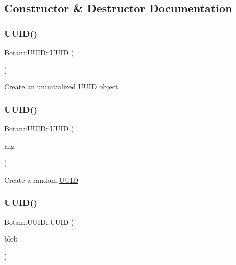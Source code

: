 \subsection{Constructor \& Destructor Documentation}
\mbox{\label{class_botan_1_1_u_u_i_d_a1e8e37568ead09e587ca96cebcbab9d2}} 
\subsubsection{\texorpdfstring{U\+U\+I\+D()}{UUID()}\hspace{0.1cm}{\footnotesize\ttfamily [1/4]}}
{\footnotesize\ttfamily Botan\+::\+U\+U\+I\+D\+::\+U\+U\+ID (\begin{DoxyParamCaption}{ }\end{DoxyParamCaption})\hspace{0.3cm}{\ttfamily [inline]}}

Create an uninitialized \hyperlink{class_botan_1_1_u_u_i_d}{U\+U\+ID} object \mbox{\label{class_botan_1_1_u_u_i_d_a97713e2316b1c612813bb03c66dcbbb6}} 
\subsubsection{\texorpdfstring{U\+U\+I\+D()}{UUID()}\hspace{0.1cm}{\footnotesize\ttfamily [2/4]}}
{\footnotesize\ttfamily Botan\+::\+U\+U\+I\+D\+::\+U\+U\+ID (\begin{DoxyParamCaption}\item[{Random\+Number\+Generator \&}]{rng }\end{DoxyParamCaption})}

Create a random \hyperlink{class_botan_1_1_u_u_i_d}{U\+U\+ID} \mbox{\label{class_botan_1_1_u_u_i_d_af2a8c7fb0ea61e9bb8c3a58a71c28724}} 
\subsubsection{\texorpdfstring{U\+U\+I\+D()}{UUID()}\hspace{0.1cm}{\footnotesize\ttfamily [3/4]}}
{\footnotesize\ttfamily Botan\+::\+U\+U\+I\+D\+::\+U\+U\+ID (\begin{DoxyParamCaption}\item[{const std\+::vector$<$ uint8\+\_\+t $>$ \&}]{blob }\end{DoxyParamCaption})}

